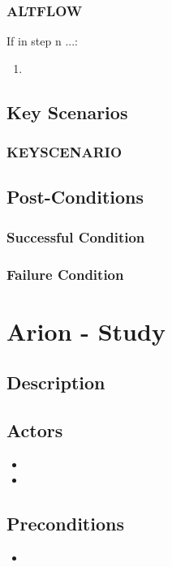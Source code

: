 \documentclass{scrreprt}
\begin{document}
    \subsection{ALTFLOW}
    If in step n ...:
    \begin{enumerate}
        \item 
    \end{enumerate}

\section{Key Scenarios}
    \subsection{KEYSCENARIO}

\section{Post-Conditions}
    \subsection{Successful Condition}
    
    \subsection{Failure Condition}


\chapter{Arion - Study}

\section{Description}

\section{Actors}
\begin{itemize}
    \item 
    \item 
\end{itemize}

\section{Preconditions}
\begin{itemize}
    \item 
\end{itemize}
\end{document}
